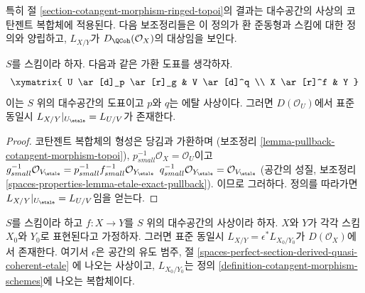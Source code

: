 \noindent
특히 절 \ref{section-cotangent-morphism-ringed-topoi}의 결과는
대수공간의 사상의 코탄젠트 복합체에 적용된다.
다음 보조정리들은 이 정의가 환 준동형과 스킴에 대한 정의와 양립하고,
$L_{X/Y}$가 $D_\QCoh(\mathcal{O}_X)$의 대상임을 보인다.

\begin{lemma}
\label{lemma-etale-localization}
$S$를 스킴이라 하자. 다음과 같은 가환 도표를 생각하자.
$$
\xymatrix{
U \ar[d]_p \ar[r]_g & V \ar[d]^q \\
X \ar[r]^f & Y
}
$$
이는 $S$ 위의 대수공간의 도표이고 $p$와 $q$는 에탈 사상이다.
그러면 $D(\mathcal{O}_U)$에서 표준 동일시
$L_{X/Y}|_{U_\etale} = L_{U/V}$가 존재한다.
\end{lemma}

\begin{proof}
코탄젠트 복합체의 형성은 당김과 가환하며
(보조정리 \ref{lemma-pullback-cotangent-morphism-topoi}),
$p_{small}^{-1}\mathcal{O}_X = \mathcal{O}_U$이고
$g_{small}^{-1}\mathcal{O}_{V_\etale} =
p_{small}^{-1}f_{small}^{-1}\mathcal{O}_{Y_\etale}$
$q_{small}^{-1}\mathcal{O}_{Y_\etale} =
\mathcal{O}_{V_\etale}$
(공간의 성질, 보조정리
\ref{spaces-properties-lemma-etale-exact-pullback}).
이므로 그러하다. 정의를 따라가면
$L_{X/Y}|_{U_\etale} = L_{U/V}$임을 얻는다.
\end{proof}

\begin{lemma}
\label{lemma-compare-spaces-schemes}
$S$를 스킴이라 하고 $f : X \to Y$를 $S$ 위의 대수공간의 사상이라 하자.
$X$와 $Y$가 각각 스킴 $X_0$와 $Y_0$로 표현된다고 가정하자.
그러면 표준 동일시
$L_{X/Y} = \epsilon^*L_{X_0/Y_0}$가 $D(\mathcal{O}_X)$에서 존재한다.
여기서 $\epsilon$은 공간의 유도 범주, 절
\ref{spaces-perfect-section-derived-quasi-coherent-etale}
에 나오는 사상이고, $L_{X_0/Y_0}$는
정의 \ref{definition-cotangent-morphism-schemes}에 나오는 복합체이다.
\end{lemma}

